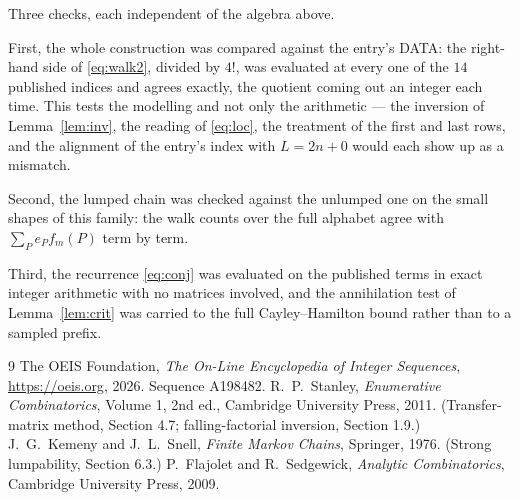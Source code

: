 \documentclass[11pt,a4paper]{article}
\theoremstyle{plain}
\theoremstyle{definition}
\begin{document}
Three checks, each independent of the algebra above.

First, the whole construction was compared against the entry's DATA: the right-hand side of
\eqref{eq:walk2}, divided by $4!$, was evaluated at every one of the $14$
published indices and agrees exactly, the quotient coming out an integer each time. This
tests the modelling and not only the arithmetic --- the inversion of Lemma~\ref{lem:inv},
the reading of \eqref{eq:loc}, the treatment of the first and last rows, and the
alignment of the entry's index with $L=2n+0$ would each show up as a mismatch.

Second, the lumped chain was checked against the unlumped one on the small shapes of this
family: the walk counts over the full alphabet agree with $\sum_P e_Pf_m(P)$ term by term.

Third, the recurrence \eqref{eq:conj} was evaluated on the published terms in exact integer
arithmetic with no matrices involved, and the annihilation test of Lemma~\ref{lem:crit} was
carried to the full Cayley--Hamilton bound rather than to a sampled prefix.

\begin{thebibliography}{9}
 The OEIS Foundation, \emph{The On-Line Encyclopedia of Integer
Sequences}, \url{https://oeis.org}, 2026. Sequence A198482.
 R.~P.~Stanley, \emph{Enumerative Combinatorics}, Volume 1, 2nd ed.,
Cambridge University Press, 2011. (Transfer-matrix method, Section 4.7; falling-factorial
inversion, Section 1.9.)
 J.~G.~Kemeny and J.~L.~Snell, \emph{Finite Markov Chains}, Springer,
1976. (Strong lumpability, Section 6.3.)
 P.~Flajolet and R.~Sedgewick, \emph{Analytic Combinatorics}, Cambridge
University Press, 2009.
\end{thebibliography}
\end{document}
